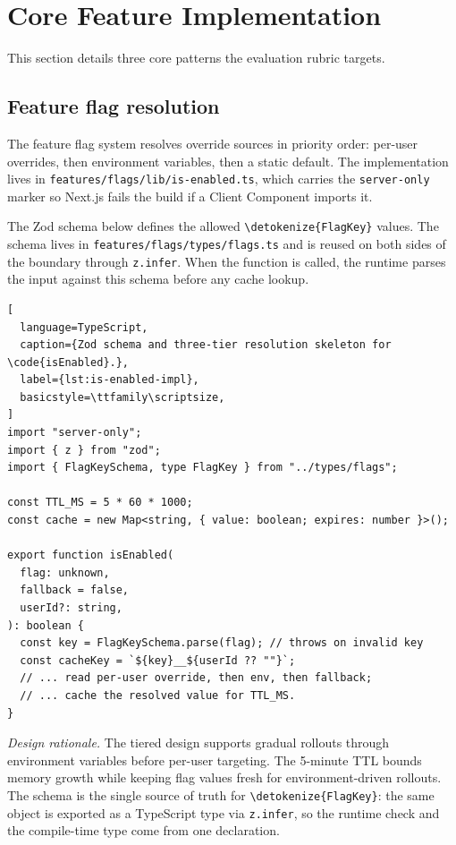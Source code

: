 \documentclass[12pt,a4paper]{report}
\newcommand{\code}[1]{\texttt{\nolinkurl{\detokenize{#1}}}}
\newcommand{\pkg}[1]{\texttt{\nolinkurl{#1}}}
\DeclareRobustCommand{\filename}[1]{\bgroup\urlstyle{tt}\nolinkurl{#1}\egroup}
\begin{document}
\section{Core Feature Implementation}
\label{sec:core-feature-implementation}

This section details three core patterns the evaluation rubric targets.

\subsection{Feature flag resolution}
\label{sec:feature-flag-resolution}

The feature flag system resolves override sources in priority order: per-user overrides, then environment variables, then a static default. The implementation lives in \filename{features/flags/lib/is-enabled.ts}, which carries the \pkg{server-only} marker so Next.js fails the build if a Client Component imports it.

The Zod schema below defines the allowed \code{FlagKey} values. The schema lives in \filename{features/flags/types/flags.ts} and is reused on both sides of the boundary through \pkg{z.infer}. When the function is called, the runtime parses the input against this schema before any cache lookup.

\begin{lstlisting}[
  language=TypeScript,
  caption={Zod schema and three-tier resolution skeleton for \code{isEnabled}.},
  label={lst:is-enabled-impl},
  basicstyle=\ttfamily\scriptsize,
]
import "server-only";
import { z } from "zod";
import { FlagKeySchema, type FlagKey } from "../types/flags";

const TTL_MS = 5 * 60 * 1000;
const cache = new Map<string, { value: boolean; expires: number }>();

export function isEnabled(
  flag: unknown,
  fallback = false,
  userId?: string,
): boolean {
  const key = FlagKeySchema.parse(flag); // throws on invalid key
  const cacheKey = `${key}__${userId ?? ""}`;
  // ... read per-user override, then env, then fallback;
  // ... cache the resolved value for TTL_MS.
}
\end{lstlisting}

\textit{Design rationale.} The tiered design supports gradual rollouts through environment variables before per-user targeting. The 5-minute TTL bounds memory growth while keeping flag values fresh for environment-driven rollouts. The schema is the single source of truth for \code{FlagKey}: the same object is exported as a TypeScript type via \pkg{z.infer}, so the runtime check and the compile-time type come from one declaration.
\end{document}
